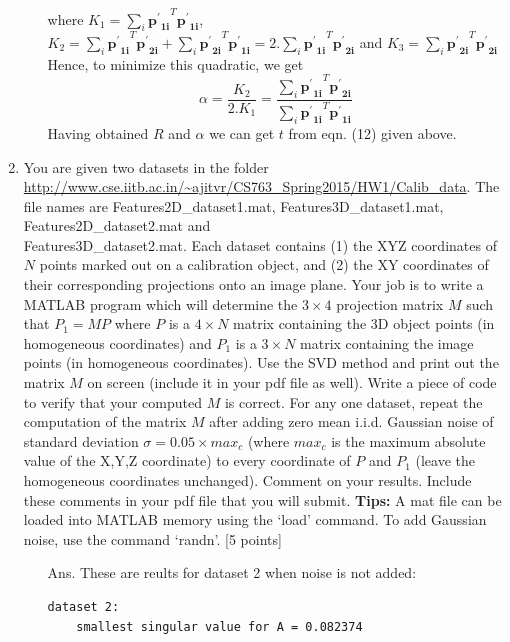 \documentclass[11pt]{article}
\begin{document}
\begin{enumerate}
\begin{itemize}
where $K_1=\sum_i \mathbf{{p^{'}}_{1i}}^T\mathbf{{p^{'}}_{1i}}$, $K_2=\sum_i \mathbf{{p^{'}}_{1i}}^T\mathbf{{p^{'}}_{2i}}+\sum_i \mathbf{{p^{'}}_{2i}}^T\mathbf{{p^{'}}_{1i}}=2.\sum_i \mathbf{{p^{'}}_{1i}}^T\mathbf{{p^{'}}_{2i}}$ and $K_3=\sum_i \mathbf{{p^{'}}_{2i}}^T\mathbf{{p^{'}}_{2i}}$\newline
Hence, to minimize this quadratic, we get \begin{equation}
\alpha= \frac{K_2}{2.K_1}=\frac{\sum_i \mathbf{{p^{'}}_{1i}}^T\mathbf{{p^{'}}_{2i}}}{\sum_i \mathbf{{p^{'}}_{1i}}^T\mathbf{{p^{'}}_{1i}}}
\end{equation}
Having obtained $R$ and $\alpha$ we can get $t$ from eqn. (12) given above.
\end{itemize}
\item You are given two datasets in the folder \url{http://www.cse.iitb.ac.in/~ajitvr/CS763_Spring2015/HW1/Calib_data}. The file names are Features2D\_dataset1.mat, Features3D\_dataset1.mat, Features2D\_dataset2.mat and \\ Features3D\_dataset2.mat. Each dataset contains (1) the XYZ coordinates of $N$ points marked out on a calibration object, and (2) the XY coordinates of their corresponding projections onto an image plane. Your job is to write a MATLAB program which will determine the $3 \times 4$ projection matrix $M$ such that $P_1 = MP$ where $P$ is a $4 \times N$ matrix containing the 3D object points (in homogeneous coordinates) and $P_1$ is a $3 \times N$ matrix containing the image points (in homogeneous coordinates). Use the SVD method and print out the matrix $M$ on screen (include it in your pdf file as well). Write a piece of code to verify that your computed $M$ is correct. For any one dataset, repeat the computation of the matrix $M$ after adding zero mean i.i.d. Gaussian noise of standard deviation $\sigma = 0.05 \times max_c$ (where $max_c$ is the maximum absolute value of the X,Y,Z coordinate) to every coordinate of $P$ and $P_1$ (leave the homogeneous coordinates unchanged). Comment on your results. Include these comments in your pdf file that you will submit. \textbf{Tips:} A mat file can be loaded into MATLAB memory using the `load' command. To add Gaussian noise, use the command `randn'. \textsf{[5 points]}
\begin{itemize}
	\item[Ans.] 
	These are reults for dataset 2 when noise is not added:
	\begin{Verbatim}[frame=single]
	dataset 2: 
	smallest singular value for A = 0.082374


\end{Verbatim}
\end{itemize}
\end{enumerate}
\end{document}
